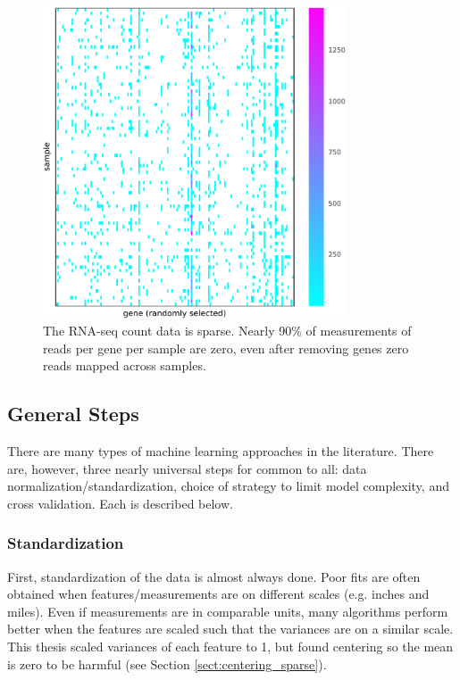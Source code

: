 \begin{figure}[H]
\centering
    \includegraphics[width=0.8\textwidth]{./tex/chapter3/figures/20170403_sparsity_illustration--754836_nonzero_features.pdf}
    \begin{singlespace}
    \caption[Sparsity of RNA-seq count data]{
        The RNA-seq count data is sparse.
        Nearly 90\% of measurements of reads per gene per sample are zero, even after removing genes zero reads mapped across samples.
        }
    \label{fig:sparse_RNA-seq}
    \end{singlespace}
\end{figure}


\subsection{General Steps}

There are many types of machine learning approaches in the literature.
There are, however, three nearly universal steps for common to all: data normalization/standardization, choice of strategy to limit model complexity, and cross validation. 
Each is described below.

\subsubsection{Standardization}
First, standardization of the data is almost always done.
Poor fits are often obtained when features/measurements are on different scales (e.g. inches and miles).
Even if measurements are in comparable units, many algorithms perform better when the features are scaled such that the variances are on a similar scale.
This thesis scaled variances of each feature to 1, but found centering so the mean is zero to be harmful (see Section \ref{sect:centering_sparse}).

